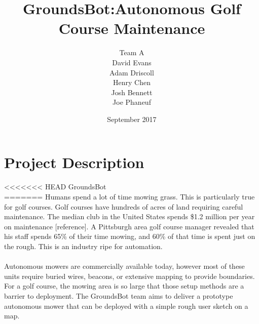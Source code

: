 \documentclass{article}
\begin{document}


\title{GroundsBot:Autonomous Golf Course Maintenance}
\date{September 2017}
\author{Team A        \\ David Evans \\
        Adam Driscoll \\ Henry Chen  \\
        Josh Bennett  \\ Joe Phaneuf \\ }
\maketitle
\newpage

\tableofcontents
\newpage

\section{Project Description}
<<<<<<< HEAD
GroundsBot \\
=======
Humans spend a lot of time mowing grass. This is particularly true for golf courses. Golf courses have hundreds of acres of land requiring careful maintenance.  The median club in the United States spends \$1.2 million per year on maintenance [reference]. A Pittsburgh area golf course manager revealed that his staff spends 65\% of their time mowing, and 60\% of that time is spent just on the rough. This is an industry ripe for automation.
\\
\\
Autonomous mowers are commercially available today, however most of these units require buried wires, beacons, or extensive mapping to provide boundaries. For a golf course, the mowing area is so large that those setup methods are a barrier to deployment. The GroundsBot team aims to deliver a prototype autonomous mower that can be deployed with a simple rough user sketch on a map.
\end{document}
